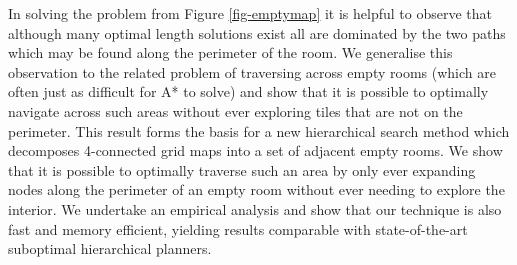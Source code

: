In solving the problem from Figure \ref{fig-emptymap} it is helpful to observe that although many optimal 
length solutions exist all are dominated by the two paths which may be found along the perimeter of 
the room. 
We generalise this observation to the related problem of traversing across empty rooms (which are 
often just as difficult for A* to solve) and show that it is possible to optimally navigate across 
such areas without ever exploring tiles that are not on the perimeter.
This result forms the basis for a new hierarchical search method which decomposes 4-connected grid maps
into a set of adjacent empty rooms. 
We show that it is possible to optimally traverse such an area by only ever expanding nodes along the
perimeter of an empty room without ever needing to explore the interior.
We undertake an empirical analysis and show that our technique is also fast and memory efficient,
yielding results comparable with state-of-the-art suboptimal hierarchical planners.
